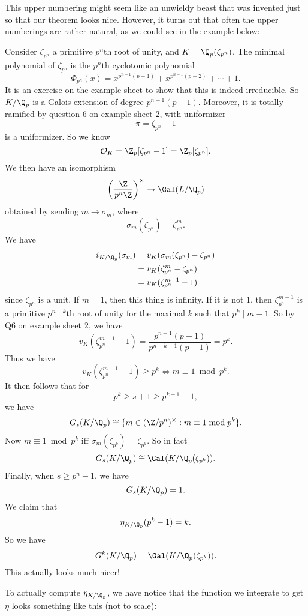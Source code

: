 \documentclass[a4paper]{article}
\begin{document}
This upper numbering might seem like an unwieldy beast that was invented just so that our theorem looks nice. However, it turns out that often the upper numberings are rather natural, as we could see in the example below:
\begin{eg}
  Consider $\zeta_{p^n}$ a primitive $p^n$th root of unity, and $K = \Q_p(\zeta_{p^n})$. The minimal polynomial of $\zeta_{p^n}$ is the $p^n$th cyclotomic polynomial
  \[
    \Phi_{p^n}(x) = x^{p^{n - 1}(p - 1)} + x^{p^{n - 1}(p - 2)} + \cdots + 1.
  \]
  It is an exercise on the example sheet to show that this is indeed irreducible. So $K/\Q_p$ is a Galois extension of degree $p^{n - 1}(p - 1)$. Moreover, it is totally ramified by question 6 on example sheet 2, with uniformizer
  \[
    \pi = \zeta_{p^n} - 1
  \]
  is a uniformizer. So we know
  \[
    \mathcal{O}_K = \Z_p[\zeta_{p^n} - 1] = \Z_p[\zeta_{p^n}].
  \]
  We then have an isomorphism
  \[
    \left(\frac{\Z}{p^n \Z}\right)^\times \to \Gal(L/\Q_p)
  \]
  obtained by sending $m \to \sigma_m$, where
  \[
    \sigma_m(\zeta_{p^n}) = \zeta_{p^n}^m.
  \]
  We have
  \begin{align*}
    i_{K/\Q_p}(\sigma_m) &= v_K(\sigma_m (\zeta_{p^n}) - \zeta_{p^n})\\
    &= v_K(\zeta_{p^n}^m - \zeta_{p^n})\\
    &= v_K(\zeta_{p^n}^{m - 1} - 1)
  \end{align*}
  since $\zeta_{p^n}$ is a unit. If $m = 1$, then this thing is infinity. If it is not $1$, then $\zeta_{p^n}^{m - 1}$ is a primitive $p^{n - k}$th root of unity for the maximal $k$ such that $p^k \mid m- 1$. So by Q6 on example sheet 2, we have
  \[
    v_K(\zeta_{p^n}^{m - 1} - 1) = \frac{p^{n - 1}(p - 1)}{p^{n - k - 1}(p - 1)} = p^k.
  \]
  Thus we have
  \[
    v_K(\zeta_{p^n}^{m - 1} - 1) \geq p^k \Leftrightarrow m \equiv 1\bmod {p^k}.
  \]
  It then follows that for
  \[
    p^k \geq s + 1 \geq p^{k - 1} + 1,
  \]
  we have
  \[
    G_s(K/\Q_p) \cong \{m \in (\Z/p^n)^\times: m \equiv 1 \bmod p^k\}.
  \]
  Now $m \equiv 1 \bmod p^k$ iff $\sigma_m(\zeta_{p^k}) = \zeta_{p^k}$. So in fact
  \[
    G_s(K/\Q_p) \cong \Gal(K/\Q_p(\zeta_{p^k})).
  \]
  Finally, when $s \geq p^n - 1$, we have
  \[
    G_s(K/\Q_p) = 1.
  \]
  We claim that
  \[
    \eta_{K/\Q_p}(p^k - 1) = k.
  \]
  So we have
  \[
    G^k(K/\Q_p) = \Gal(K/\Q_p(\zeta_{p^k})).
  \]
  This actually looks much nicer!

  To actually compute $\eta_{K/\Q_p}$, we have notice that the function we integrate to get $\eta$ looks something like this (not to scale):
  \begin{center}
\end{center}
\end{eg}
\end{document}
